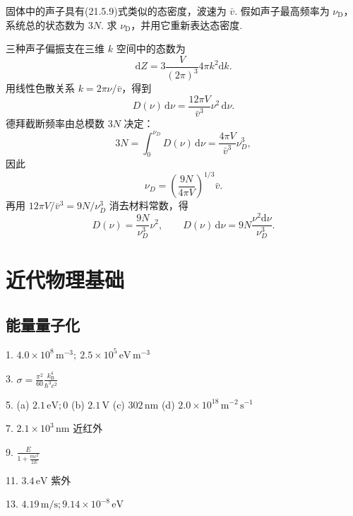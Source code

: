 \begin{exercise}\label{ex:21.7}
固体中的声子具有(21.5.9)式类似的态密度，波速为 $\bar{v}$. 假如声子最高频率为 $\nu_{\mathrm{D}}$，系统总的状态数为 $3N$. 求 $\nu_{\mathrm{D}}$，并用它重新表达态密度.
\end{exercise}
\begin{solution}
三种声子偏振支在三维 $k$ 空间中的态数为
\[
\mathrm{d}Z=3\frac{V}{(2\pi)^3}4\pi k^2\mathrm{d}k.
\]
用线性色散关系 $k=2\pi\nu/\bar v$，得到
\[
D(\nu)\,\mathrm{d}\nu
=\frac{12\pi V}{\bar v^3}\nu^2\,\mathrm{d}\nu.
\]
德拜截断频率由总模数 $3N$ 决定：
\[
3N=\int_0^{\nu_D}D(\nu)\,\mathrm{d}\nu
=\frac{4\pi V}{\bar v^3}\nu_D^3,
\]
因此
\[
\boxed{\nu_D=\left(\frac{9N}{4\pi V}\right)^{1/3}\bar v}.
\]
再用 $12\pi V/\bar v^3=9N/\nu_D^3$ 消去材料常数，得
\[
\boxed{D(\nu)=\frac{9N}{\nu_D^3}\nu^2},\qquad
D(\nu)\,\mathrm{d}\nu=9N\frac{\nu^2\mathrm{d}\nu}{\nu_D^3}.
\]
\end{solution}



\part{近代物理基础}


\chapter{能量量子化}

\begin{oddanswers}
1. $4.0 \times 10^8\,\mathrm{m^{-3}};\ 2.5 \times 10^5\,\mathrm{eV\,m^{-3}}$

3. $\sigma = \frac{\pi^2}{60} \frac{k_{\mathrm{B}}^4}{\hbar^3 c^2}$

5. (a) $2.1\,\mathrm{eV}; 0$
(b) $2.1\,\mathrm{V}$
(c) $302\,\mathrm{nm}$
(d) $2.0 \times 10^{18}\,\mathrm{m}^{-2}\,\mathrm{s}^{-1}$

7. $2.1 \times 10^3\,\mathrm{nm}$ 近红外

9. $\frac{E}{1 + \frac{mc^2}{2E}}$

11. $3.4\,\mathrm{eV}$ 紫外

13. $4.19\,\mathrm{m/s}; 9.14 \times 10^{-8}\,\mathrm{eV}$
\end{oddanswers}

